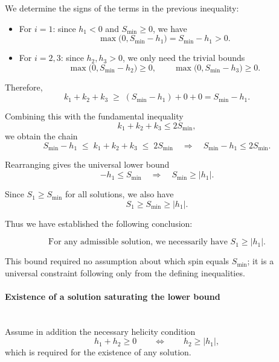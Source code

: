 \documentclass[12pt]{article}
\begin{document}
We determine the signs of the terms in the previous inequality:
\begin{itemize}
    \item For $i=1$: since $h_1<0$ and $S_{\min}\ge 0$, we have
    \begin{equation}
    \max\bigl(0, S_{\min}-h_1\bigr)
    = S_{\min}-h_1
    > 0.
    \end{equation}

    \item For $i=2,3$: since $h_2, h_3 > 0$, we only need the trivial bounds
    \begin{equation}
    \max\bigl(0, S_{\min}-h_2\bigr) \ge 0, 
    \qquad
    \max\bigl(0, S_{\min}-h_3\bigr) \ge 0.
    \end{equation}
\end{itemize}

Therefore,
\begin{equation}
k_1 + k_2 + k_3
\;\ge\;
(S_{\min}-h_1) + 0 + 0
=
S_{\min} - h_1.
\end{equation}

Combining this with the fundamental inequality
\begin{equation}
k_1 + k_2 + k_3 \le 2 S_{\min},
\end{equation}
we obtain the chain
\begin{equation}
S_{\min}-h_1 \;\le\; k_1+k_2+k_3 \;\le\; 2S_{\min}
\quad\Longrightarrow\quad
S_{\min}-h_1 \le 2 S_{\min}.
\end{equation}

Rearranging gives the universal lower bound
\begin{equation}
-h_1 \le S_{\min}
\quad\Longrightarrow\quad
S_{\min} \ge |h_1|.
\end{equation}

Since $S_1 \ge S_{\min}$ for all solutions, we also have
\begin{equation}
S_1 \ge S_{\min} \ge |h_1|.
\end{equation}

Thus we have established the following conclusion:

\begin{equation}
\boxed{
\text{For any admissible solution, we necessarily have } 
S_1 \ge |h_1|.
}
\end{equation}

This bound required no assumption about which spin equals $S_{\min}$;
it is a universal constraint following only from the defining inequalities.

\paragraph{Existence of a solution saturating the lower bound}\mbox{}\\
Assume in addition the necessary helicity condition
\begin{equation}
h_1 + h_2 \ge 0 
\qquad\Longleftrightarrow\qquad
h_2 \ge |h_1|,
\end{equation}
which is required for the existence of any solution.
\end{document}

